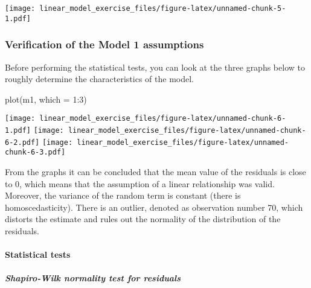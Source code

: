 \documentclass[
]{article}
\newenvironment{Shaded}{\begin{snugshade}}{\end{snugshade}}
\newcommand{\AttributeTok}[1]{\textcolor[rgb]{0.77,0.63,0.00}{#1}}
\newcommand{\DecValTok}[1]{\textcolor[rgb]{0.00,0.00,0.81}{#1}}
\newcommand{\FunctionTok}[1]{\textcolor[rgb]{0.00,0.00,0.00}{#1}}
\newcommand{\NormalTok}[1]{#1}
\newcommand{\SpecialCharTok}[1]{\textcolor[rgb]{0.00,0.00,0.00}{#1}}
\begin{document}
\texttt{[image: linear\_model\_exercise\_files/figure-latex/unnamed-chunk-5-1.pdf]}

\hypertarget{verification-of-the-model-1-assumptions}{%
\subsubsection{Verification of the Model 1
assumptions}\label{verification-of-the-model-1-assumptions}}

Before performing the statistical tests, you can look at the three
graphs below to roughly determine the characteristics of the model.

\begin{Shaded}
\begin{Highlighting}[]
\FunctionTok{plot}\NormalTok{(m1, }\AttributeTok{which =} \DecValTok{1}\SpecialCharTok{:}\DecValTok{3}\NormalTok{)}
\end{Highlighting}
\end{Shaded}

\texttt{[image: linear\_model\_exercise\_files/figure-latex/unnamed-chunk-6-1.pdf]}
\texttt{[image: linear\_model\_exercise\_files/figure-latex/unnamed-chunk-6-2.pdf]}
\texttt{[image: linear\_model\_exercise\_files/figure-latex/unnamed-chunk-6-3.pdf]}

From the graphs it can be concluded that the mean value of the residuals
is close to 0, which means that the assumption of a linear relationship
was valid. Moreover, the variance of the random term is constant (there
is homoscedasticity). There is an outlier, denoted as observation number
70, which distorts the estimate and rules out the normality of the
distribution of the residuals.

\hypertarget{statistical-tests}{%
\paragraph{Statistical tests}\label{statistical-tests}}

\hypertarget{shapiro-wilk-normality-test-for-residuals}{%
\subparagraph{Shapiro-Wilk normality test for
residuals}\label{shapiro-wilk-normality-test-for-residuals}}

\begin{Shaded}
\end{Shaded}
\end{document}
